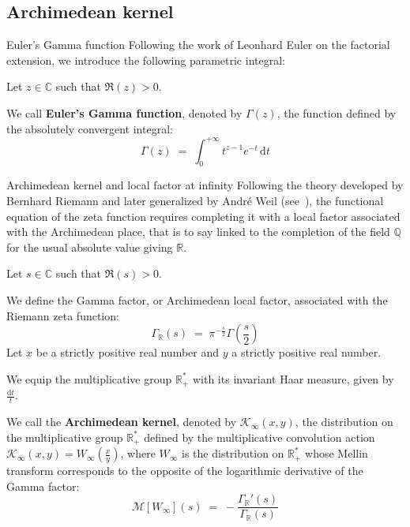 \documentclass[Riemann_Hypothesis.tex]{subfiles}
\begin{document}
\color{red}
\subsection{Archimedean kernel}
\color{black}

\begin{DefNefEn}[label=df:FonctionGammaEuler]{Euler's Gamma function}
    Following the work of Leonhard Euler on the factorial extension, 
    we introduce the following parametric integral: \par
    Let $z \in \mathbb{C}$ such that $\Re(z) > 0$. \par
    We call \textbf{Euler's Gamma function}, denoted by $\Gamma(z)$, 
    the function defined by the absolutely convergent integral:
    \begin{equation*}
        \Gamma(z) \;=\; \int_{0}^{+\infty} t^{z-1} e^{-t} \,\mathrm{d}t
    \end{equation*}
\end{DefNefEn}

\begin{DefNefEn}[label=df:NoyauArchimedien]{Archimedean kernel and local factor at infinity}
    Following the theory developed by Bernhard Riemann and later generalized by André Weil 
    (see~\cite{weil1952_formules_en}), 
    the functional equation of the zeta function requires completing it with a local factor associated with the Archimedean place, that is to say linked to the completion of the field $\mathbb{Q}$ for the usual absolute value giving $\mathbb{R}$. \par
    Let $s \in \mathbb{C}$ such that $\Re(s) > 0$. \par
    We define the Gamma factor, or Archimedean local factor, associated with the Riemann zeta function:
    \begin{equation*}
        \Gamma_{\mathbb{R}}(s) \;=\; \pi^{-\frac{s}{2}} \Gamma\left(\frac{s}{2}\right)
    \end{equation*}
    Let $x$ be a strictly positive real number and $y$ a strictly positive real number. \par
    We equip the multiplicative group $\mathbb{R}_+^*$ with its invariant Haar measure, given by $\frac{\mathrm{d}t}{t}$. \par
    We call the \textbf{Archimedean kernel}, denoted by $\mathcal{K}_{\infty}(x,y)$, the distribution on the multiplicative group $\mathbb{R}_+^*$ defined by the multiplicative convolution action $\mathcal{K}_{\infty}(x,y) = W_{\infty}\left(\frac{x}{y}\right)$, where $W_{\infty}$ is the distribution on $\mathbb{R}_+^*$ whose Mellin transform corresponds to the opposite of the logarithmic derivative of the Gamma factor:
    \begin{equation*}
        \mathcal{M}[W_{\infty}](s) \;=\; -\frac{\Gamma_{\mathbb{R}}'(s)}{\Gamma_{\mathbb{R}}(s)}
    \end{equation*}
\end{DefNefEn}
\end{document}
